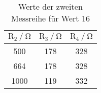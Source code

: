 \begin{table}[H]
  \centering
  \caption{Werte der zweiten Messreihe für Wert 16}
  \label{tab:tabe7}
    \begin{tabular}{c c c}
    \toprule
    $ \text{R}_2 \: / \: \si{\ohm} $ & $\text{R}_3 \: / \: \si{\ohm} $ &
    $\text{R}_4 \: / \: \si{\ohm} $ \\
    \midrule
    500 & 178 & 328 \\
    664 & 178 & 328 \\
    1000 & 119 & 332 \\
    \bottomrule
    \end{tabular}
\end{table}

